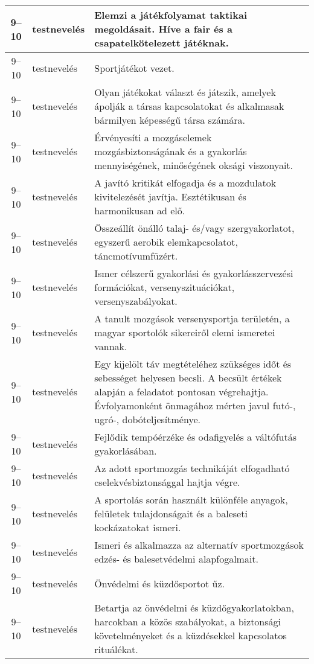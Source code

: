 \begin{small}
\begin{longtable}{c | p{2cm} |  p{11cm} }
              9--10 & testnevelés & Elemzi a játékfolyamat taktikai megoldásait. Híve a fair és a csapatelkötelezett játéknak. \\ \hline
              9--10 & testnevelés & Sportjátékot vezet. \\ \hline
              9--10 & testnevelés & Olyan játékokat választ és játszik, amelyek ápolják a társas kapcsolatokat és alkalmasak bármilyen képességű társa számára. \\ \hline
              9--10 & testnevelés & Érvényesíti a mozgáselemek mozgásbiztonságának és a gyakorlás mennyiségének, minőségének oksági viszonyait. \\ \hline
              9--10 & testnevelés & A javító kritikát elfogadja és a mozdulatok kivitelezését javítja. Esztétikusan és harmonikusan ad elő. \\ \hline
              9--10 & testnevelés & Összeállít önálló talaj- és/vagy szergyakorlatot, egyszerű aerobik elemkapcsolatot, táncmotívumfüzért. \\ \hline
              9--10 & testnevelés & Ismer célszerű gyakorlási és gyakorlásszervezési formációkat, versenyszituációkat, versenyszabályokat. \\ \hline
              9--10 & testnevelés & A tanult mozgások versenysportja területén, a magyar sportolók sikereiről elemi ismeretei vannak. \\ \hline
              9--10 & testnevelés & Egy kijelölt táv megtételéhez szükséges időt és sebességet helyesen becsli. A becsült értékek alapján a feladatot pontosan végrehajtja. Évfolyamonként önmagához mérten javul futó-, ugró-, dobóteljesítménye. \\ \hline
              9--10 & testnevelés & Fejlődik tempóérzéke és odafigyelés a váltófutás gyakorlásában. \\ \hline
              9--10 & testnevelés & Az adott sportmozgás technikáját elfogadható cselekvésbiztonsággal hajtja végre. \\ \hline
              9--10 & testnevelés & A sportolás során használt különféle anyagok, felületek tulajdonságait és a baleseti kockázatokat ismeri. \\ \hline
              9--10 & testnevelés & Ismeri és alkalmazza az alternatív sportmozgások edzés- és balesetvédelmi alapfogalmait. \\ \hline
              9--10 & testnevelés & Önvédelmi és küzdősportot űz. \\ \hline
              9--10 & testnevelés & Betartja az önvédelmi és küzdőgyakorlatokban, harcokban a közös szabályokat, a biztonsági követelményeket és a küzdésekkel kapcsolatos rituálékat. \\ \hline

\end{longtable}
\end{small}
